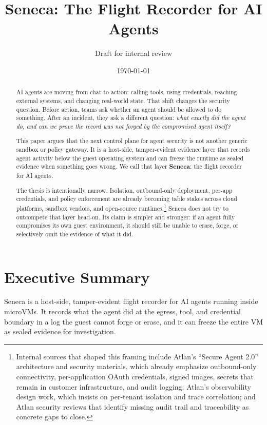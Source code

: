 \documentclass[11pt]{article}
\title{Seneca: The Flight Recorder for AI Agents}
\author{Draft for internal review}
\date{\today}
\begin{document}
\maketitle

\begin{abstract}
AI agents are moving from chat to action: calling tools, using credentials, reaching external systems, and changing real-world state. That shift changes the security question. Before action, teams ask whether an agent should be allowed to do something. After an incident, they ask a different question: \emph{what exactly did the agent do, and can we prove the record was not forged by the compromised agent itself?}

This paper argues that the next control plane for agent security is not another generic sandbox or policy gateway. It is a host-side, tamper-evident evidence layer that records agent activity below the guest operating system and can freeze the runtime as sealed evidence when something goes wrong. We call that layer \textbf{Seneca}: the flight recorder for AI agents.

The thesis is intentionally narrow. Isolation, outbound-only deployment, per-app credentials, and policy enforcement are already becoming table stakes across cloud platforms, sandbox vendors, and open-source runtimes.\footnote{Internal sources that shaped this framing include Atlan's ``Secure Agent 2.0'' architecture and security materials, which already emphasize outbound-only connectivity, per-application OAuth credentials, signed images, secrets that remain in customer infrastructure, and audit logging; Atlan's observability design work, which insists on per-tenant isolation and trace correlation; and Atlan security reviews that identify missing audit trail and traceability as concrete gaps to close.} Seneca does not try to outcompete that layer head-on. Its claim is simpler and stronger: if an agent fully compromises its own guest environment, it should still be unable to erase, forge, or selectively omit the evidence of what it did.
\end{abstract}

\tableofcontents

\newpage

\section{Executive Summary}

Seneca is a host-side, tamper-evident flight recorder for AI agents running inside microVMs. It records what the agent did at the egress, tool, and credential boundary in a log the guest cannot forge or erase, and it can freeze the entire VM as sealed evidence for investigation.
\end{document}
